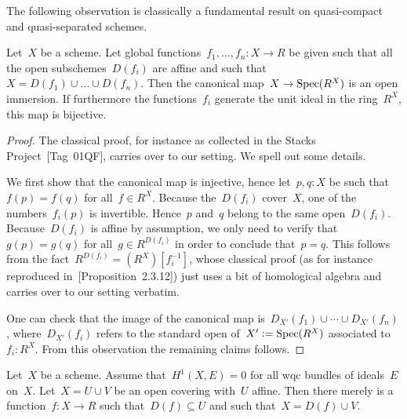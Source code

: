 


The following observation is classically a fundamental result on quasi-compact
and quasi-separated schemes.

\begin{lemma}\label{enough-functions-affine}
  Let~$X$ be a scheme. Let global functions~$f_1,\ldots,f_n : X \to R$ be given
  such that all the open subschemes~$D(f_i)$ are affine and such that~$X =
  D(f_1) \cup \ldots \cup D(f_n)$. Then the canonical map~$X \to \operatorname{Spec}(R^X)$ is
  an open immersion. If furthermore the functions~$f_i$ generate the unit ideal
  in the ring~$R^X$, this map is bijective.
\end{lemma}

\begin{proof}
  The classical proof, for instance as collected in the Stacks
  Project~\cite{stacks}[Tag~01QF], carries over to our setting. We spell out
  some details.

  We first show that the canonical map is injective, hence let~$p,q : X$ be such
  that~$f(p) = f(q)$ for all~$f \in R^X$. Because the~$D(f_i)$ cover~$X$, one
  of the numbers~$f_i(p)$ is invertible. Hence~$p$ and~$q$ belong to the same
  open~$D(f_i)$. Because~$D(f_i)$ is affine by assumption, we only need to
  verify that~$g(p) = g(q)$ for all~$g \in R^{D(f_i)}$ in order to conclude
  that~$p = q$. This follows from the fact~$R^{D(f_i)} = (R^X)[f_i^{-1}]$,
  whose classical proof (as for instance reproduced
  in~\cite{liu}[Proposition~2.3.12]) just uses a bit of homological algebra and
  carries over to our setting verbatim.

  One can check that the image of the canonical map is~$D_{X'}(f_1) \cup \cdots
  \cup D_{X'}(f_n)$, where~$D_{X'}(f_i)$ refers to the standard open of~$X'
  \vcentcolon= \operatorname{Spec}(R^X)$ associated to~$f_i : R^X$. From this observation the
  remaining claims follows.
\end{proof}


\begin{lemma}\label{serre-workhorse}
  Let~$X$ be a scheme. Assume that~$H^1(X, E) = 0$ for all wqc bundles of ideals~$E$
  on~$X$. Let~$X = U \cup V$ be an open covering with~$U$ affine. Then there
  merely is a function~$f : X \to R$ such that~$D(f) \subseteq U$ and such
  that~$X = D(f) \cup V$.
\end{lemma}

